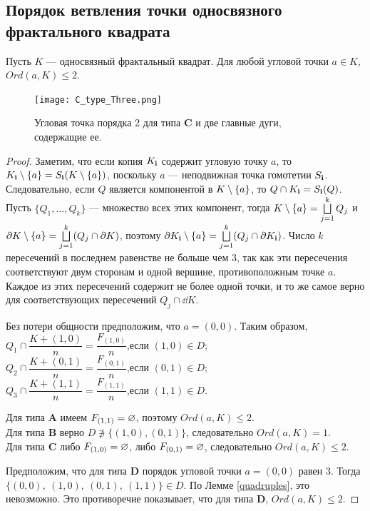 \subsection{Порядок ветвления точки односвязного фрактального квадрата}

\begin{lemma}\label{thm:vertex_branching}
Пусть $K$ --- односвязный фрактальный квадрат.
Для любой угловой точки $a\in K$,
 $Ord(a,K)\leq 2$.
\end{lemma}

\begin{figure}[h!]
\centering
\texttt{[image: C\_type\_Three.png]}
\caption{Угловая точка порядка 2 для типа {\bf C} и две главные дуги, содержащие ее.} 
\label{fig:C_type_Three}
\end{figure}

\begin{proof}\label{proof:vertex_branching}
Заметим, что если копия $K_{\bf{i}}$ содержит угловую точку $a$, то 
$K_{\bf{i}}\setminus \{a\}=S_{\bf{i}}(K\setminus \{a\})$, поскольку $a$ --- неподвижная точка гомотетии $S_{\bf{i}}$.
Следовательно, если $Q$ является компонентой в $K\setminus \{a\}$, то $Q\cap K_{\bf{i}}=S_{\bf{i}}(Q)$. 
Пусть $\{Q_1,\ldots, Q_k\}$ --- множество всех этих компонент, тогда $K\setminus \{a\}=\bigsqcup \limits_{j=1}^kQ_j$ и $\partial K\setminus \{a\}=\bigsqcup \limits_{j=1}^k(Q_j\cap\partial K)$, поэтому $\partial K_{\bf{i}}\setminus \{a\}=\bigsqcup \limits_{j=1}^k(Q_j\cap\partial K_{\bf{i}})$. 
Число $k$ пересечений в последнем равенстве не больше чем $3$, так как эти пересечения соответствуют двум сторонам и одной вершине, противоположным точке $a$. 
Каждое из этих пересечений содержит не более одной точки, и то же самое верно для соответствующих пересечений $Q_j\cap\dd K$.

Без потери общности предположим, что  $a=(0,0)$.
Таким образом,\\ 
$Q_1\cap\dfrac{K+(1,0)}{n} =\dfrac{F_{(1,0)}}{n}$,\quad если $(1,0)\in D$;\\
$Q_2\cap\dfrac{K+(0,1)}{n} =\dfrac{F_{(0,1)}}{n}$,\quad если $(0,1)\in D$;\\ 
$Q_3\cap\dfrac{K+(1,1)}{n} =\dfrac{F_{(1,1)}}{n}$,\quad если $(1,1)\in D$.

\noindent 
Для типа {\bf A} имеем $F_{(1,1)}=\varnothing$, поэтому $Ord(a,K)\leq 2$.\\
Для типа {\bf B} верно $D\not\ni\{(1,0),(0,1)\}$, следовательно $Ord(a,K)=1$.\\
Для типа {\bf C} либо $F_{(1,0)}=\varnothing$, либо $F_{(0,1)}=\varnothing$, следовательно $Ord(a,K)\leq 2$.

Предположим, что для типа {\bf D} порядок угловой точки $a=(0,0)$ равен $3$.
Тогда $\{(0,0),\ (1,0),\ (0,1),\ (1,1)\}\in D$. 
По Лемме \ref{quadruples}, это невозможно.
Это противоречие показывает, что для типа {\bf D}, $Ord(a,K)\leq 2$.
\end{proof}

